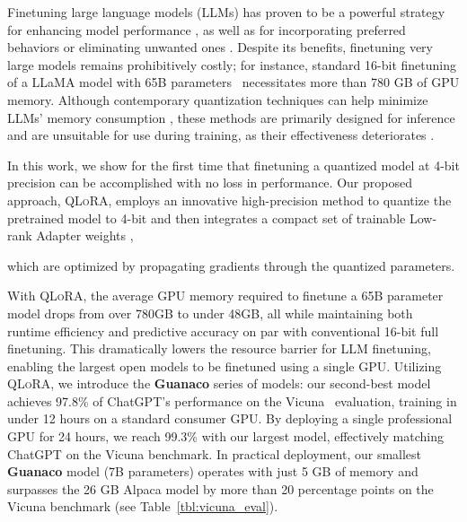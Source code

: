 Finetuning large language models (LLMs) has proven to be a powerful strategy for enhancing model performance \citep{min2021metaicl, wei2021finetuned, ouyang2022training, wang2022super, wang2022self, liu2022few}, as well as for incorporating preferred behaviors or eliminating unwanted ones \citep{ouyang2022training,askell2021general,bai2022training}. Despite its benefits, finetuning very large models remains prohibitively costly; for instance, standard 16-bit finetuning of a LLaMA model with 65B parameters~\citep{touvron2023llama} necessitates more than 780 GB of GPU memory. Although contemporary quantization techniques can help minimize LLMs' memory consumption \citep{dettmers2022llm, dettmers2022case, frantar2022gptq, xiao2022smoothquant}, these methods are primarily designed for inference and are unsuitable for use during training, as their effectiveness deteriorates \citep{wortsman2023stable}.

In this work, we show for the first time that finetuning a quantized model at 4-bit precision can be accomplished with no loss in performance. Our proposed approach, \textsc{QLoRA}, employs an innovative high-precision method to quantize the pretrained model to 4-bit and then integrates a compact set of trainable Low-rank Adapter weights \citep{hu2021lora}, 

which are optimized by propagating gradients through the quantized parameters.

With \textsc{QLoRA}, the average GPU memory required to finetune a 65B parameter model drops from over 780GB to under 48GB, all while maintaining both runtime efficiency and predictive accuracy on par with conventional 16-bit full finetuning. This dramatically lowers the resource barrier for LLM finetuning, enabling the largest open models to be finetuned using a single GPU. Utilizing \textsc{QLoRA}, we introduce the \textbf{Guanaco} series of models: our second-best model achieves 97.8\% of ChatGPT's performance on the Vicuna~\citep{vicuna2023} evaluation, training in under 12 hours on a standard consumer GPU. By deploying a single professional GPU for 24 hours, we reach 99.3\% with our largest model, effectively matching ChatGPT on the Vicuna benchmark. In practical deployment, our smallest \textbf{Guanaco} model (7B parameters) operates with just 5 GB of memory and surpasses the 26 GB Alpaca model by more than 20 percentage points on the Vicuna benchmark (see Table~\ref{tbl:vicuna_eval}).

